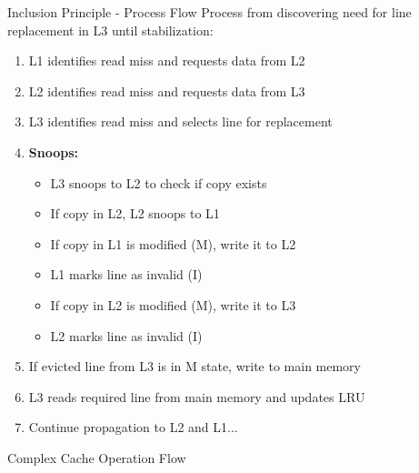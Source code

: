 \documentclass[aspectratio=169,12pt]{beamer}
\begin{document}
\begin{frame}{Inclusion Principle - Process Flow}
\small
Process from discovering need for line replacement in L3 until stabilization:

\begin{enumerate}
    \item L1 identifies read miss and requests data from L2
    \item L2 identifies read miss and requests data from L3
    \item L3 identifies read miss and selects line for replacement
    \item \textbf{Snoops:}
    \begin{itemize}
        \item L3 snoops to L2 to check if copy exists
        \item If copy in L2, L2 snoops to L1
        \item If copy in L1 is modified (M), write it to L2
        \item L1 marks line as invalid (I)
        \item If copy in L2 is modified (M), write it to L3
        \item L2 marks line as invalid (I)
    \end{itemize}
    \item If evicted line from L3 is in M state, write to main memory
    \item L3 reads required line from main memory and updates LRU
    \item Continue propagation to L2 and L1...
\end{enumerate}
\end{frame}

\begin{frame}{Complex Cache Operation Flow}
\begin{center}
\end{center}
\end{frame}
\end{document}
